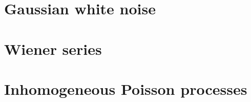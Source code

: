 \documentclass[12pt]{article}
\theoremstyle{slplain}
\theoremstyle{sldefinition}
\theoremstyle{remark}
\begin{document}
\section{Gaussian white noise}\label{sec:whitenoise}




\section{Wiener series}\label{sec:wiener}




\section{Inhomogeneous Poisson processes}\label{sec:poisson}
















\end{document}
